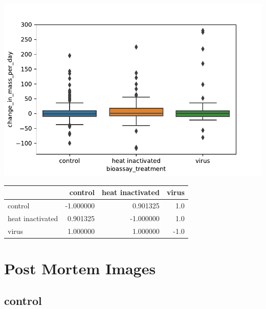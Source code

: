 \documentclass[11pt]{scrartcl}
\begin{document}
\begin{center}
     \includegraphics[width=\textwidth]{bp.pdf}
\end{center}

\begin{tabular}{lrrr}
\toprule
{} &   control &  heat inactivated &  virus \\
\midrule
control          & -1.000000 &          0.901325 &    1.0 \\
heat inactivated &  0.901325 &         -1.000000 &    1.0 \\
virus            &  1.000000 &          1.000000 &   -1.0 \\
\bottomrule
\end{tabular}


\clearpage
\section{Post Mortem Images}
\subsection{control}
\end{document}
